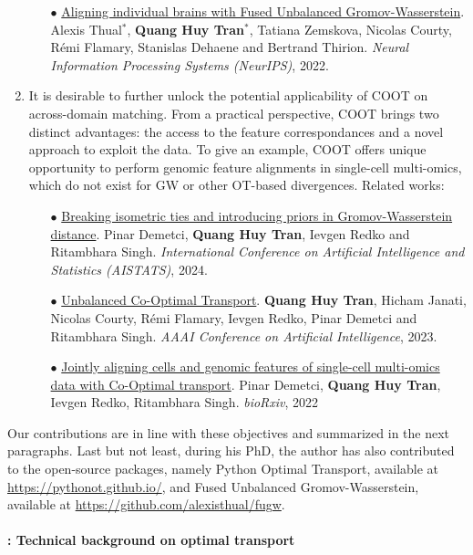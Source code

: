 \begin{enumerate}
\begin{itemize}
        \item[$\bullet$] \ul{Aligning individual brains with Fused Unbalanced Gromov-Wasserstein}.
         Alexis Thual$^*$, \textbf{Quang Huy Tran$^*$}, Tatiana Zemskova, Nicolas Courty,
         Rémi Flamary, Stanislas Dehaene and  Bertrand Thirion.
         \textit{Neural Information Processing Systems (NeurIPS)}, 2022.
    \end{itemize}

    \item It is desirable to further unlock the potential applicability of COOT
    on across-domain matching. From a practical perspective, COOT brings two distinct advantages:
    the access to the feature correspondances and a novel approach to exploit the data.
    To give an example, COOT offers unique opportunity to perform genomic feature alignments
    in single-cell multi-omics, which do not exist for GW or other OT-based divergences. Related works:
    \begin{itemize}
        \item[$\bullet$] \ul{Breaking isometric ties and introducing priors in Gromov-Wasserstein distance}.
        Pinar Demetci, \textbf{Quang Huy Tran}, Ievgen Redko and Ritambhara Singh.
        \textit{International Conference on Artificial Intelligence and Statistics (AISTATS)}, 2024.

        \item[$\bullet$] \ul{Unbalanced Co-Optimal Transport}. \textbf{Quang Huy Tran}, Hicham Janati,
        Nicolas Courty, Rémi Flamary, Ievgen Redko, Pinar Demetci and Ritambhara Singh.
        \textit{AAAI Conference on Artificial Intelligence}, 2023.

        \item[$\bullet$] \ul{Jointly aligning cells and genomic features of single-cell multi-omics data with Co-Optimal transport}.
        Pinar Demetci, \textbf{Quang Huy Tran}, Ievgen Redko, Ritambhara Singh. \textit{bioRxiv}, 2022
    \end{itemize}
\end{enumerate}
Our contributions are in line with these objectives and summarized in the next paragraphs.
Last but not least, during his PhD, the author has also contributed to the open-source packages,
namely Python Optimal Transport, available at \url{https://pythonot.github.io/}, and
Fused Unbalanced Gromov-Wasserstein, available at \url{https://github.com/alexisthual/fugw}.

\paragraph{ : Technical background on optimal transport}

